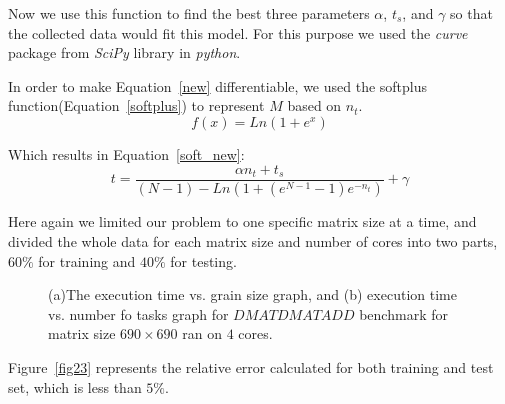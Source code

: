 Now we use this function to find the best three parameters $\alpha$, $t_s$, and $\gamma$ so that the collected data would fit this model. For this purpose we used the \textit{curve} package from \textit{SciPy} library in \textit{python}.

In order to make Equation~\ref{new} differentiable, we used the softplus function(Equation~\ref{softplus}) to represent $M$ based on $n_t$.
\begin{equation}\label{softplus}
f(x)=Ln(1+e^x)
\end{equation}

Which results in Equation~\ref{soft_new}:
\begin{equation}\label{soft_new}
t=\frac{\alpha{n_t}+t_s}{(N-1)-Ln(1+(e^{N-1}-1)e^{-n_t})}+\gamma
\end{equation}

Here again we limited our problem to one specific matrix size at a time, and divided the whole data for each matrix size and number of cores into two parts, $60\%$ for training and $40\%$ for testing.


\vspace{\baselineskip}	
\begin{figure}[H]
	\centering
	\caption{(a)The execution time vs. grain size graph, and (b) execution time vs. number fo tasks graph for $DMATDMATADD$ benchmark for matrix size $690\times690$ ran on $4$ cores.}	
	\label{fig22}
\end{figure}
\vspace{\baselineskip}	
Figure~\ref{fig23} represents the relative error calculated for both training and test set, which is less than $5\%$.


